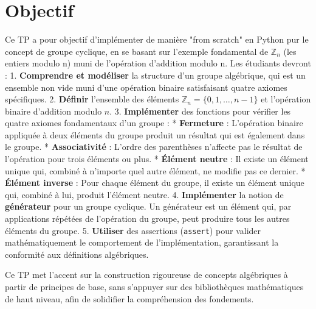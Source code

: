 \documentclass{report}
\begin{document}
\section*{Objectif}
Ce TP a pour objectif d'implémenter de manière "from scratch" en Python pur le concept de groupe cyclique, en se basant sur l'exemple fondamental de $\mathbb{Z}_n$ (les entiers modulo n) muni de l'opération d'addition modulo n.
Les étudiants devront :
1.  \textbf{Comprendre et modéliser} la structure d'un groupe algébrique, qui est un ensemble non vide muni d'une opération binaire satisfaisant quatre axiomes spécifiques.
2.  \textbf{Définir} l'ensemble des éléments $\mathbb{Z}_n = \{0, 1, \dots, n-1\}$ et l'opération binaire d'addition modulo $n$.
3.  \textbf{Implémenter} des fonctions pour vérifier les quatre axiomes fondamentaux d'un groupe :
    *   \textbf{Fermeture} : L'opération binaire appliquée à deux éléments du groupe produit un résultat qui est également dans le groupe.
    *   \textbf{Associativité} : L'ordre des parenthèses n'affecte pas le résultat de l'opération pour trois éléments ou plus.
    *   \textbf{Élément neutre} : Il existe un élément unique qui, combiné à n'importe quel autre élément, ne modifie pas ce dernier.
    *   \textbf{Élément inverse} : Pour chaque élément du groupe, il existe un élément unique qui, combiné à lui, produit l'élément neutre.
4.  \textbf{Implémenter} la notion de \textbf{générateur} pour un groupe cyclique. Un générateur est un élément qui, par applications répétées de l'opération du groupe, peut produire tous les autres éléments du groupe.
5.  \textbf{Utiliser} des assertions (\texttt{assert}) pour valider mathématiquement le comportement de l'implémentation, garantissant la conformité aux définitions algébriques.

Ce TP met l'accent sur la construction rigoureuse de concepts algébriques à partir de principes de base, sans s'appuyer sur des bibliothèques mathématiques de haut niveau, afin de solidifier la compréhension des fondements.
\end{document}
